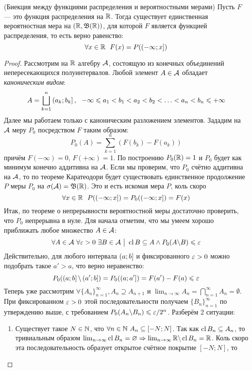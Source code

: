 \begin{theorem} (Биекция между функциями распределения и вероятностными мерами)
	Пусть $F$ --- это функция распределения на $\mathbb{R}$. Тогда существует единственная вероятностная мера на $(\mathbb{R}, \mathfrak{B}(\mathbb{R}))$, для которой $F$ является функцией распределения, то есть верно равенство:
	\[
		\forall x \in \mathbb{R}\ \ F(x) = P(\left(-\infty; x\right])
	\]
\end{theorem}

\begin{proof}
	Рассмотрим на $\mathbb{R}$ алгебру $\mathcal{A}$, состоящую из конечных объединений непересекающихся полуинтервалов. Любой элемент $A \in \mathcal{A}$ обладает \textit{каноническим видом}:
	\[
		A = \bigsqcup_{k = 1}^n \left(a_k; b_k\right],\ \ -\infty \leqslant a_1 < b_1 < a_2 < b_2 < \ldots < a_n < b_n \leqslant +\infty
	\]
	Далее мы работаем только с каноническим разложением элементов. Зададим на $\mathcal{A}$ меру $P_0$ посредством $F$ таким образом:
	\[
		P_0(A) = \sum_{k = 1}^n (F(b_k) - F(a_k))
	\]
	причём $F(-\infty) = 0$, $F(+\infty) = 1$. По построению $P_0(\mathbb{R}) = 1$ и $P_0$ будет как минимум конечно аддитивна на $\mathcal{A}$. Если мы проверим, что $P_0$ счётно аддитивна на $\mathcal{A}$, то по теореме Каратеодори будет существовать единственное продолжение $P$ меры $P_0$ на $\sigma(\mathcal{A}) = \mathfrak{B}(\mathbb{R})$. Это и есть искомая мера $P$, коль скоро
	\[
		\forall x \in \R\ \ P(\rsi{-\infty; x}) = P_0(\rsi{-\infty; x}) = F(x)
	\]
	Итак, по теореме о непрерывности вероятностной меры достаточно проверить, что $P_0$ непрерывна в нуле. Для начала отметим, что мы умеем хорошо приближать любое множество $A \in \mathcal{A}$:
	\[
		\forall A \in \mathcal{A}\ \forall \varepsilon > 0\ \exists B \in \mathcal{A} \ \big|\  \operatorname{cl} B \subseteq A \wedge P_0(A \backslash B) \leqslant \varepsilon
	\]
	Действительно, для любого интервала $\left(a; b\right]$ и фиксированного $\varepsilon > 0$ можно подобрать такое $a' > a$, что верно неравенство:
	\[
		P_0(\left(a; b\right] \backslash \left(a'; b\right]) = P_0(\left(a; a'\right]) = F(a') - F(a) \leqslant \varepsilon
	\]
	Теперь уже рассмотрим $\forall \{A_n\}_{n = 1}^\infty, A_n \supseteq A_{n + 1}$ и $\lim_{n \to \infty} A_n = \bigcap_{n = 1}^\infty A_n = \emptyset$. При фиксированном $\varepsilon > 0$ этой последовательности получаем $\{B_n\}_{n = 1}^\infty$ по утверждению выше, с требованием $P_0(A_n \backslash B_n) \leqslant \varepsilon / 2^n$. Разберём 2 ситуации:
	\begin{enumerate}
		\item Существует такое $N \in \mathbb{N}$, что $\forall n \in \mathbb{N}\ A_n \subseteq [-N; N]$. Так как $\operatorname{cl} B_n \subseteq A_n$, то тривиальным образом $\lim_{n \to \infty} \operatorname{cl} B_n = \varnothing \Rightarrow \lim_{n \to \infty} \mathbb{R} \backslash \operatorname{cl} B_n = \mathbb{R}$. Коль скоро эта последовательность образует открытое счётное покрытие $[-N; N]$, то

\end{enumerate}
\end{proof}
